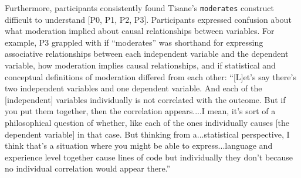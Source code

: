 
Furthermore, participants consistently found Tisane's \texttt{moderates}
construct difficult to understand [P0, P1, P2, P3]. Participants expressed
confusion about what moderation implied about causal relationships between
variables. For example, P3 grappled with if ``moderates'' was shorthand for
expressing associative relationships between each independent variable and the
dependent variable, how moderation implies causal relationships, and if
statistical and conceptual definitions of moderation differed from each other:
``[L]et's say there's two independent variables and one dependent variable. And
each of the [independent] variables individually is not correlated with the
outcome. But if you put them together, then the correlation appears....I mean,
it's sort of a philosophical question of whether, like each of the ones
individually causes [the dependent variable] in that case. But thinking from
a...statistical perspective, I think that's a situation where you might be able
to express...language and experience level together cause lines of code but
individually they don't because no individual correlation would appear there.''

